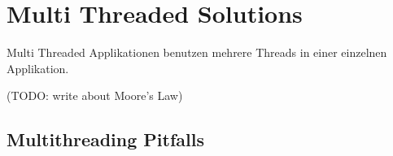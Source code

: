 \section{Multi Threaded Solutions}
\label{section: Multi Threaded Solutions}

Multi Threaded Applikationen benutzen mehrere Threads in einer einzelnen Applikation. \cite[p. 1]{DabMIT}


(TODO: write about Moore’s Law)

\subsection{Multithreading Pitfalls}
\label{subsection: multithreading pitfalls}

\cite[p. 2]{Sch97}


